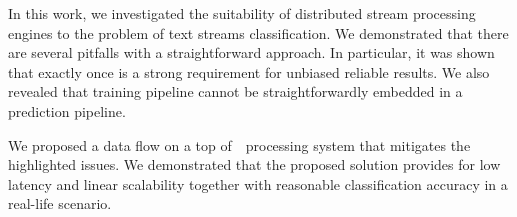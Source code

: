 \label {fs-short-conclusion}

In this work, we investigated the suitability of distributed stream processing engines to the problem of text streams classification. We demonstrated that there are several pitfalls with a straightforward approach. In particular, it was shown that exactly once is a strong requirement for unbiased reliable results. We also revealed that training pipeline cannot be straightforwardly embedded in a prediction pipeline. 

We proposed a data flow on a top of~\FlameStream\ processing system that mitigates the highlighted issues. We demonstrated that the proposed solution provides for low latency and linear scalability together with reasonable classification accuracy in a real-life scenario.